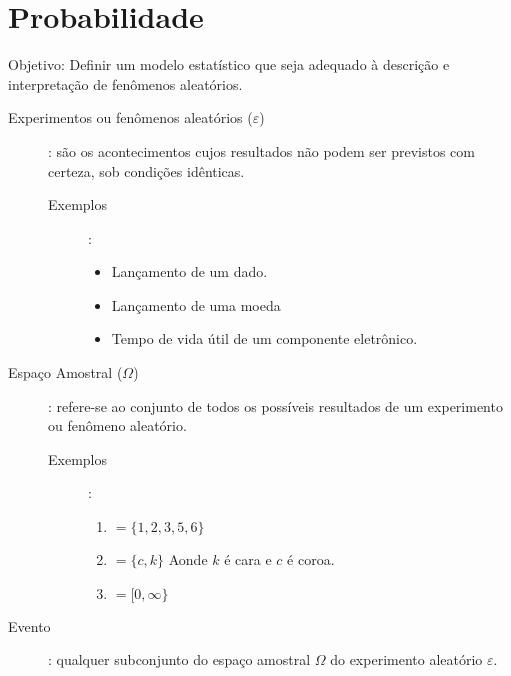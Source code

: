 \documentclass[11pt,a4paper]{book}
\begin{document}
\chapter{Probabilidade}
Objetivo: Definir um modelo estatístico que seja adequado à descrição e interpretação de fenômenos aleatórios.

\begin{description}
  \item [Experimentos ou fenômenos aleatórios ($\varepsilon$)]: são os acontecimentos cujos resultados não podem ser previstos 
    com certeza, sob condições idênticas.

    \begin{description}
      \item [Exemplos]:

        \begin{itemize}
          \item Lançamento de um dado.
          \item Lançamento de uma moeda
          \item Tempo de vida útil de um componente eletrônico.
        \end{itemize}
    \end{description}
  \item [Espaço Amostral ($\Omega$)]: refere-se ao conjunto de todos os possíveis resultados de um experimento ou fenômeno 
    aleatório.
    \begin{description}
      \item [Exemplos]:
        \begin{enumerate}[label=$\Omega_{\arabic*}$]
          \item $= \{ 1,2,3,5,6 \}$ 
          \item $= \{ c,k \}$ Aonde $k$ é cara e $c$ é coroa.
          \item $= [ 0,\infty \}$ 
        \end{enumerate}
    \end{description}
  \item [Evento]: qualquer subconjunto do espaço amostral $\Omega$ do experimento aleatório $\varepsilon$.

\end{description}
\end{document}

